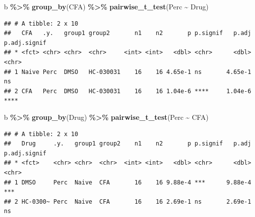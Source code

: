\documentclass[
]{book}
\newenvironment{Shaded}{\begin{snugshade}}{\end{snugshade}}
\newcommand{\FunctionTok}[1]{\textcolor[rgb]{0.13,0.29,0.53}{\textbf{#1}}}
\newcommand{\NormalTok}[1]{#1}
\newcommand{\SpecialCharTok}[1]{\textcolor[rgb]{0.81,0.36,0.00}{\textbf{#1}}}
\begin{document}
\begin{Shaded}
\begin{Highlighting}[]
\NormalTok{b }\SpecialCharTok{\%\textgreater{}\%}
  \FunctionTok{group\_by}\NormalTok{(CFA) }\SpecialCharTok{\%\textgreater{}\%}
  \FunctionTok{pairwise\_t\_test}\NormalTok{(Perc }\SpecialCharTok{\textasciitilde{}}\NormalTok{ Drug)}
\end{Highlighting}
\end{Shaded}

\begin{verbatim}
## # A tibble: 2 x 10
##   CFA   .y.   group1 group2       n1    n2       p p.signif   p.adj p.adj.signif
## * <fct> <chr> <chr>  <chr>     <int> <int>   <dbl> <chr>      <dbl> <chr>       
## 1 Naive Perc  DMSO   HC-030031    16    16 4.65e-1 ns       4.65e-1 ns          
## 2 CFA   Perc  DMSO   HC-030031    16    16 1.04e-6 ****     1.04e-6 ****
\end{verbatim}

\begin{Shaded}
\begin{Highlighting}[]
\NormalTok{b }\SpecialCharTok{\%\textgreater{}\%}
  \FunctionTok{group\_by}\NormalTok{(Drug) }\SpecialCharTok{\%\textgreater{}\%}
  \FunctionTok{pairwise\_t\_test}\NormalTok{(Perc }\SpecialCharTok{\textasciitilde{}}\NormalTok{ CFA)}
\end{Highlighting}
\end{Shaded}

\begin{verbatim}
## # A tibble: 2 x 10
##   Drug     .y.   group1 group2    n1    n2       p p.signif   p.adj p.adj.signif
## * <fct>    <chr> <chr>  <chr>  <int> <int>   <dbl> <chr>      <dbl> <chr>       
## 1 DMSO     Perc  Naive  CFA       16    16 9.88e-4 ***      9.88e-4 ***         
## 2 HC-0300~ Perc  Naive  CFA       16    16 2.69e-1 ns       2.69e-1 ns
\end{verbatim}


\end{document}

